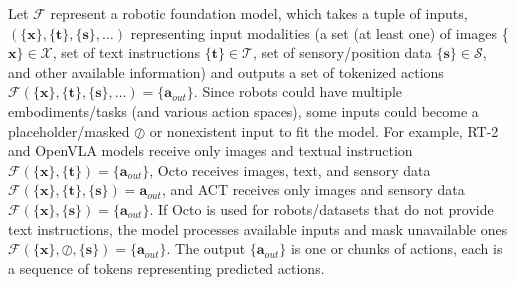 {Let $\mathcal{F}$ represent a robotic foundation model, which takes a tuple of inputs, \eg $(\{\bm{x}\}, \{\bm{t}\}, \{\bm{s}\}, \dots)$ representing input modalities (\ie a set (at least one) of images \{$\bm{x}\} \in \mathcal{X}$, set of text instructions $\{\bm{t}\} \in \mathcal{T}$, set of sensory/position data $\{\bm{s}\}\in \mathcal{S}$, and other available information) and outputs a set of tokenized actions $\mathcal{F}(\{\bm{x}\}, \{\bm{t}\}, \{\bm{s}\}, \dots)=\{\bm{a}_{out}\}$.
Since robots could have multiple embodiments/tasks (and various action spaces), some inputs could become a placeholder/masked $\oslash$ or nonexistent input to fit the model.}
For example, RT-2 and OpenVLA models receive only images and textual instruction $\mathcal{F}(\{\bm{x}\}, \{\bm{t}\})=\{\bm{a}_{out}\}$, 
Octo receives images, text, and sensory data $\mathcal{F}(\{\bm{x}\}, \{\bm{t}\}, \{\bm{s}\})=\bm{a}_{out}$, and ACT receives only images and sensory data $\mathcal{F}(\{\bm{x}\}, \{\bm{s}\})=\{\bm{a}_{out}\}$.
If Octo is used for robots/datasets that do not provide text instructions, the model processes available inputs and mask unavailable ones $\mathcal{F}(\{\bm{x}\}, \oslash,\{\bm{s}\})=\{\bm{a}_{out}\}$.
The output $\{\bm{a}_{out}\}$ is one or chunks of actions, each is a sequence of tokens representing predicted actions.



